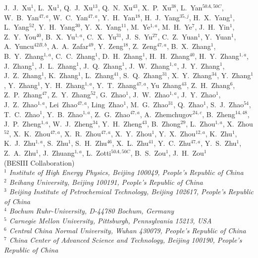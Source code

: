 \documentclass[aps,prd,twocolumn,showpacs,floatfix,byrevtex]{revtex4-1}
\begin{document}
{J.~J.~Xu$^{1}$, L.~Xu$^{1}$, Q.~J.~Xu$^{13}$, Q.~N.~Xu$^{43}$, X.~P.~Xu$^{38}$, L.~Yan$^{50A,50C}$, W.~B.~Yan$^{47,a}$, W.~C.~Yan$^{47,a}$, Y.~H.~Yan$^{18}$, H.~J.~Yang$^{35,j}$, H.~X.~Yang$^{1}$, L.~Yang$^{52}$, Y.~H.~Yang$^{30}$, Y.~X.~Yang$^{11}$, M.~Ye$^{1,a}$, M.~H.~Ye$^{7}$, J.~H.~Yin$^{1}$, Z.~Y.~You$^{40}$, B.~X.~Yu$^{1,a}$, C.~X.~Yu$^{31}$, J.~S.~Yu$^{27}$, C.~Z.~Yuan$^{1}$, Y.~Yuan$^{1}$, A.~Yuncu$^{42B,b}$, A.~A.~Zafar$^{49}$, Y.~Zeng$^{18}$, Z.~Zeng$^{47,a}$, B.~X.~Zhang$^{1}$, B.~Y.~Zhang$^{1,a}$, C.~C.~Zhang$^{1}$, D.~H.~Zhang$^{1}$, H.~H.~Zhang$^{40}$, H.~Y.~Zhang$^{1,a}$, J.~Zhang$^{1}$, J.~L.~Zhang$^{1}$, J.~Q.~Zhang$^{1}$, J.~W.~Zhang$^{1,a}$, J.~Y.~Zhang$^{1}$, J.~Z.~Zhang$^{1}$, K.~Zhang$^{1}$, L.~Zhang$^{41}$, S.~Q.~Zhang$^{31}$, X.~Y.~Zhang$^{34}$, Y.~Zhang$^{1}$, Y.~Zhang$^{1}$, Y.~H.~Zhang$^{1,a}$, Y.~T.~Zhang$^{47,a}$, Yu~Zhang$^{43}$, Z.~H.~Zhang$^{6}$, Z.~P.~Zhang$^{47}$, Z.~Y.~Zhang$^{52}$, G.~Zhao$^{1}$, J.~W.~Zhao$^{1,a}$, J.~Y.~Zhao$^{1}$, J.~Z.~Zhao$^{1,a}$, Lei~Zhao$^{47,a}$, Ling~Zhao$^{1}$, M.~G.~Zhao$^{31}$, Q.~Zhao$^{1}$, S.~J.~Zhao$^{54}$, T.~C.~Zhao$^{1}$, Y.~B.~Zhao$^{1,a}$, Z.~G.~Zhao$^{47,a}$, A.~Zhemchugov$^{24,c}$, B.~Zheng$^{14,48}$, J.~P.~Zheng$^{1,a}$, W.~J.~Zheng$^{34}$, Y.~H.~Zheng$^{43}$, B.~Zhong$^{29}$, L.~Zhou$^{1,a}$, X.~Zhou$^{52}$, X.~K.~Zhou$^{47,a}$, X.~R.~Zhou$^{47,a}$, X.~Y.~Zhou$^{1}$, Y.~X.~Zhou$^{12,a}$, K.~Zhu$^{1}$, K.~J.~Zhu$^{1,a}$, S.~Zhu$^{1}$, S.~H.~Zhu$^{46}$, X.~L.~Zhu$^{41}$, Y.~C.~Zhu$^{47,a}$, Y.~S.~Zhu$^{1}$, Z.~A.~Zhu$^{1}$, J.~Zhuang$^{1,a}$, L.~Zotti$^{50A,50C}$, B.~S.~Zou$^{1}$, J.~H.~Zou$^{1}$
\\
\vspace{0.2cm}
(BESIII Collaboration)\\
\vspace{0.2cm} {\it
$^{1}$ Institute of High Energy Physics, Beijing 100049, People's Republic of China\\
$^{2}$ Beihang University, Beijing 100191, People's Republic of China\\
$^{3}$ Beijing Institute of Petrochemical Technology, Beijing 102617, People's Republic of China\\
$^{4}$ Bochum Ruhr-University, D-44780 Bochum, Germany\\
$^{5}$ Carnegie Mellon University, Pittsburgh, Pennsylvania 15213, USA\\
$^{6}$ Central China Normal University, Wuhan 430079, People's Republic of China\\
$^{7}$ China Center of Advanced Science and Technology, Beijing 100190, People's Republic of China\\
}}
\end{document}
